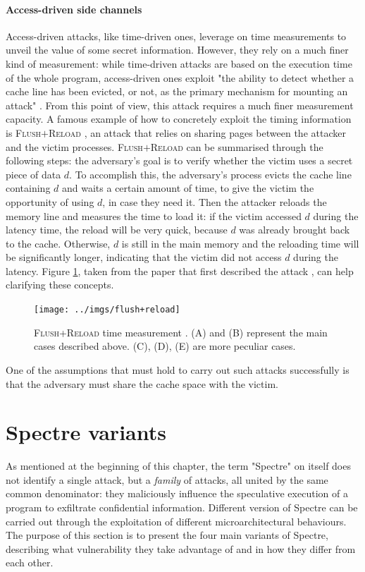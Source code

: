\documentclass[12pt,a4paper]{book}
\theoremstyle{definition}
\begin{document}
	\paragraph{Access-driven side channels} 
	Access-driven attacks, like time-driven ones, leverage on time measurements to unveil the value of some secret information. However, they rely on a much finer kind of measurement: while time-driven attacks are based on the execution time of the whole program, access-driven ones exploit "the ability to
	detect whether a cache line has been evicted, or not, as the primary
	mechanism for mounting an attack" \cite{Neve2007}. From this point of view, this attack requires a much finer measurement capacity. A famous example of how to concretely exploit the timing information is \textsc{Flush$+$Reload} \cite{Yarom2014}, an attack that relies on sharing pages between the attacker and the victim processes. \textsc{Flush$+$Reload} can be summarised through the following steps: the adversary's goal is to verify whether the victim uses a secret piece of data $d$. To accomplish this, the adversary's process evicts the cache line containing $d$ and waits a certain amount of time, to give the victim the opportunity of using $d$, in case they need it. Then the attacker reloads the memory line and measures the time to load it: if the victim accessed $d$ during the latency time, the reload will be very quick, because $d$ was already brought back to the cache. Otherwise, $d$ is still in the main memory and the reloading time will be significantly longer, indicating that the victim did not access $d$ during the latency. Figure \ref{fig:flush-reload}, taken from the paper that first described the attack \cite{Yarom2014}, can help clarifying these concepts.  
	\begin{figure}[h!]
		\centering
		\texttt{[image: ../imgs/flush+reload]}
		\captionsetup{width=.7\linewidth}
		\caption{\textsc{Flush+Reload} time measurement \cite{Yarom2014}. (A) and (B) represent the main cases described above. (C), (D), (E) are more peculiar cases.}
		\label{fig:flush-reload}
	\end{figure}
	One of the assumptions that must hold to carry out such attacks successfully is that the adversary must share the cache space with the victim.
	
	\section{Spectre variants}\label{sec:spectre-var}
	As mentioned at the beginning of this chapter, the term "Spectre" on itself does not identify a single attack, but a \textit{family} of attacks, all united by the same common denominator: they maliciously influence the speculative execution of a program to exfiltrate confidential information. Different version of Spectre can be carried out through the exploitation of different microarchitectural behaviours. The purpose of this section is to present the four main variants of Spectre, describing what vulnerability they take advantage of and in how they differ from each other.
\end{document}
